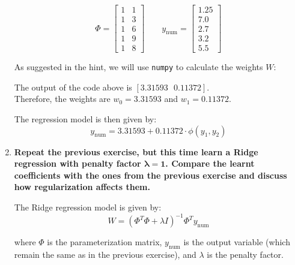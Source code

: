 \documentclass[12pt]{article}
\begin{document}
\begin{enumerate}
    \begin{equation*}
        \Phi = \begin{bmatrix}
            1 & 1 \\
            1 & 3 \\
            1 & 6 \\
            1 & 9 \\
            1 & 8
        \end{bmatrix} \qquad
        y_\text{num} = \begin{bmatrix}
            1.25 \\
            7.0 \\
            2.7 \\
            3.2 \\
            5.5
        \end{bmatrix}
    \end{equation*}

    As suggested in the hint, we will use \texttt{numpy} to calculate the weights $W$:

    \vspace{10pt}
    

    \vspace{10pt}
    The output of the code above is $[3.31593\text{ }0.11372]$.\\ 
    Therefore, the weights are $w_0 = 3.31593$ and $w_1 = 0.11372$.

    \vspace{10pt}
    The regression model is then given by:
    \begin{equation*}
        y_\text{num} = 3.31593 + 0.11372 \cdot \phi(y_1, y_2)
    \end{equation*}

    \item \textbf{Repeat the previous exercise, but this time learn a Ridge regression with penalty
    factor $\mathbf{\lambda = 1}$. Compare the learnt coeﬃcients with the ones from the previous exercise and
    discuss how regularization aﬀects them.}

    \vspace{10pt}
    The Ridge regression model is given by:
    \begin{equation*}
        W = (\Phi^T \Phi + \lambda I)^{-1} \Phi^T y_\text{num}
    \end{equation*}
    
    where $\Phi$ is the parameterization matrix, $y_\text{num}$ is the output variable (which remain the same as in the previous exercise), and $\lambda$ is the penalty factor.


\end{enumerate}
\end{document}
